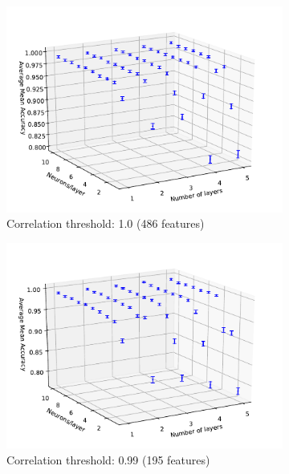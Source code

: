 \documentclass[paper=a4, fontsize=11pt]{scrartcl} %
\begin{document}
\begin{figure}[H]
	\begin{subfigure}{0.5\linewidth}
		\centering
		\includegraphics[width=0.9\linewidth]{../output/neural_network/figures/nn_architecture_global_standard_941_486}
		\caption{Correlation threshold: 1.0 (486 features)}
	\end{subfigure}
	\begin{subfigure}{0.5\linewidth}
		\centering
		\includegraphics[width=0.9\linewidth]{../output/neural_network/figures/nn_architecture_global_standard_941_486_feature_pearson_99}
		\caption{Correlation threshold: 0.99 (195 features)}
	\end{subfigure}
	\begin{subfigure}{0.5\linewidth}
		\centering

\end{subfigure}
\end{figure}
\end{document}
